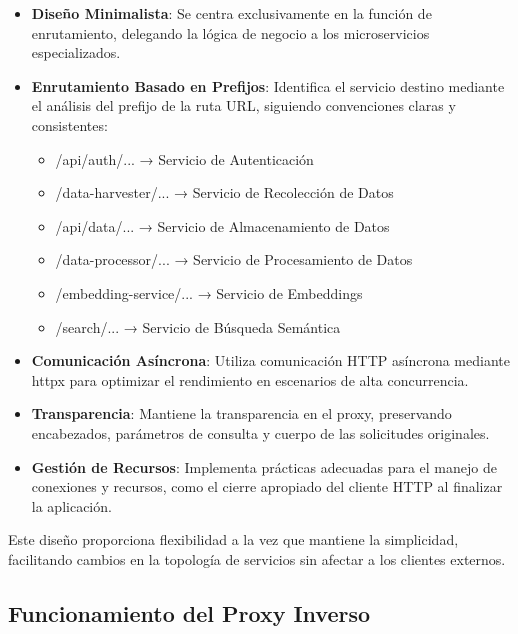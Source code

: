 \documentclass[12pt,a4paper]{article}
\begin{document}
\begin{itemize}
    \item \textbf{Diseño Minimalista}: Se centra exclusivamente en la función de enrutamiento, delegando la lógica de negocio a los microservicios especializados.
    
    \item \textbf{Enrutamiento Basado en Prefijos}: Identifica el servicio destino mediante el análisis del prefijo de la ruta URL, siguiendo convenciones claras y consistentes:
    
    \begin{itemize}
        \item /api/auth/... → Servicio de Autenticación
        \item /data-harvester/... → Servicio de Recolección de Datos
        \item /api/data/... → Servicio de Almacenamiento de Datos
        \item /data-processor/... → Servicio de Procesamiento de Datos
        \item /embedding-service/... → Servicio de Embeddings
        \item /search/... → Servicio de Búsqueda Semántica
    \end{itemize}
    
    \item \textbf{Comunicación Asíncrona}: Utiliza comunicación HTTP asíncrona mediante httpx para optimizar el rendimiento en escenarios de alta concurrencia.
    
    \item \textbf{Transparencia}: Mantiene la transparencia en el proxy, preservando encabezados, parámetros de consulta y cuerpo de las solicitudes originales.
    
    \item \textbf{Gestión de Recursos}: Implementa prácticas adecuadas para el manejo de conexiones y recursos, como el cierre apropiado del cliente HTTP al finalizar la aplicación.
\end{itemize}

Este diseño proporciona flexibilidad a la vez que mantiene la simplicidad, facilitando cambios en la topología de servicios sin afectar a los clientes externos.

\subsection{Funcionamiento del Proxy Inverso}
\label{subsec:os-proxy}
\end{document}
